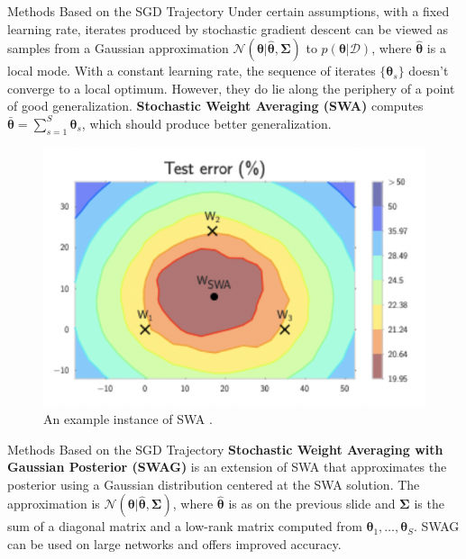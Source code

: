 \documentclass{beamer}
\begin{document}
\begin{frame}{Methods Based on the SGD Trajectory}
    Under certain assumptions, with a fixed learning rate, iterates produced by stochastic gradient descent can be viewed as samples from a Gaussian approximation $\mathcal{N}(\boldsymbol{\theta} | \hat{\boldsymbol{\theta}}, \boldsymbol{\Sigma})$ to $p(\boldsymbol{\theta} | \mathcal{D})$, where $\hat{\boldsymbol{\theta}}$ is a local mode. With a constant learning rate, the sequence of iterates $\{\boldsymbol{\theta}_s\}$ doesn't converge to a local optimum. However, they do lie along the periphery of a point of good generalization. \textbf{Stochastic Weight Averaging (SWA)} computes $\bar{\boldsymbol{\theta}} = \sum_{s = 1}^S \boldsymbol{\theta}_s$, which should produce better generalization.
    
    \begin{figure}
        \centering
        \includegraphics[scale=0.5]{stochastic_weight_averaging}
        \caption{An example instance of SWA \cite{pml2Book}.}
        \label{fig:stochastic_weight_averaging}
    \end{figure}
\end{frame}

\begin{frame}{Methods Based on the SGD Trajectory}
    \textbf{Stochastic Weight Averaging with Gaussian Posterior (SWAG)} is an extension of SWA that approximates the posterior using a Gaussian distribution centered at the SWA solution. The approximation is $\mathcal{N}(\boldsymbol{\theta} | \hat{\boldsymbol{\theta}}, \boldsymbol{\Sigma})$, where $\hat{\boldsymbol{\theta}}$ is as on the previous slide and $\boldsymbol{\Sigma}$ is the sum of a diagonal matrix and a low-rank matrix computed from $\boldsymbol{\theta}_1, \ldots, \boldsymbol{\theta}_S$. SWAG can be used on large networks and offers improved accuracy.
\end{frame}
\end{document}
